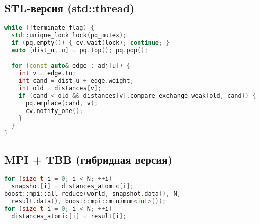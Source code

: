 \documentclass[12pt,a4paper]{extarticle}
\begin{document}
\subsection{STL-версия (std::thread)}

\begin{lstlisting}[language=C++, caption={Поток-работник для std::thread}]
while (!terminate_flag) {
  std::unique_lock lock(pq_mutex);
  if (pq.empty()) { cv.wait(lock); continue; }
  auto [dist_u, u] = pq.top(); pq.pop();

  for (const auto& edge : adj[u]) {
    int v = edge.to;
    int cand = dist_u + edge.weight;
    int old = distances[v];
    if (cand < old && distances[v].compare_exchange_weak(old, cand)) {
      pq.emplace(cand, v);
      cv.notify_one();
    }
  }
}
\end{lstlisting}

\subsection{MPI + TBB (гибридная версия)}

\begin{lstlisting}[language=C++, caption={SyncGlobalDistances}]
for (size_t i = 0; i < N; ++i)
  snapshot[i] = distances_atomic[i];
boost::mpi::all_reduce(world, snapshot.data(), N,
  result.data(), boost::mpi::minimum<int>());
for (size_t i = 0; i < N; ++i)
  distances_atomic[i] = result[i];
\end{lstlisting}
\end{document}
